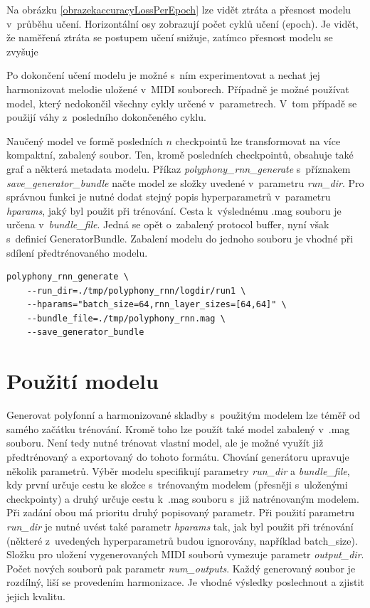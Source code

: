 Na obrázku \ref{obrazekaccuracyLossPerEpoch} lze vidět ztráta a přesnost modelu v~průběhu učení.
Horizontální osy zobrazují počet cyklů učení (epoch).
Je vidět, že naměřená ztráta se postupem učení snižuje, 
zatímco přesnost modelu se zvyšuje

Po dokončení učení modelu je možné s~ním experimentovat 
a nechat jej harmonizovat melodie uložené v~MIDI souborech.
Případně je možné používat model, který nedokončil všechny cykly určené v~parametrech.
V~tom případě se použijí váhy z~posledního dokončeného cyklu.
\par
Naučený model ve formě posledních $n$ checkpointů lze transformovat
na více kompaktní, zabalený soubor.
Ten, kromě posledních checkpointů, obsahuje také graf a některá metadata modelu.
Příkaz \emph{polyphony\_rnn\_generate} s~příznakem \emph{save\_generator\_bundle}
načte model ze složky uvedené v~parametru \emph{run\_dir}.
Pro správnou funkci je nutné dodat stejný popis hyperparametrů v~parametru \emph{hparams}, 
jaký byl použit při trénování.
Cesta k~výslednému .mag souboru je určena v~\emph{bundle\_file}.
Jedná se opět o~zabalený protocol buffer, nyní však s~definicí GeneratorBundle.
Zabalení modelu do jednoho souboru je vhodné při sdílení předtrénovaného modelu.
\cite{google_git_polyphony}

\begin{verbatim}
polyphony_rnn_generate \
    --run_dir=./tmp/polyphony_rnn/logdir/run1 \
    --hparams="batch_size=64,rnn_layer_sizes=[64,64]" \
    --bundle_file=./tmp/polyphony_rnn.mag \
    --save_generator_bundle
\end{verbatim}

\section{Použití modelu}
Generovat polyfonní a harmonizované skladby s~použitým modelem
lze téměř od samého začátku trénování.
Kromě toho lze použít také model zabalený v~.mag souboru.
Není tedy nutné trénovat vlastní model, 
ale je možné využít již předtrénovaný a exportovaný do tohoto formátu.
Chování generátoru upravuje několik parametrů.
Výběr modelu specifikují parametry \emph{run\_dir} a \emph{bundle\_file},
kdy první určuje cestu ke složce s~trénovaným modelem (přesněji s~uloženými checkpointy)
a druhý určuje cestu k~.mag souboru s~již natrénovaným modelem.
Při zadání obou má prioritu druhý popisovaný parametr.
Při použití parametru \emph{run\_dir} je nutné uvést
také parametr \emph{hparams} tak, jak byl použit při trénování 
(některé z~uvedených hyperparametrů budou ignorovány, například batch\_size).
Složku pro uložení vygenerovaných MIDI souborů vymezuje parametr \emph{output\_dir}.
Počet nových souborů pak parametr \emph{num\_outputs}.
Každý generovaný soubor je rozdílný, liší se provedením harmonizace.
Je vhodné výsledky poslechnout a zjistit jejich kvalitu.
\par

